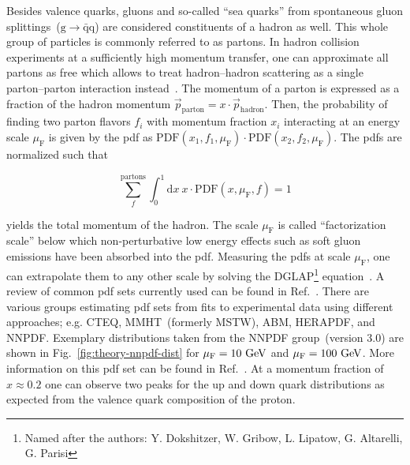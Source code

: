 Besides valence quarks, gluons and so-called ``sea quarks'' from spontaneous gluon splittings~($\mathrm{g}\to\bar{\mathrm{q}}\mathrm{q}$) are considered constituents of a hadron as well. This whole group of particles is commonly referred to as partons. In hadron collision experiments at a sufficiently high momentum transfer, one can approximate all partons as free which allows to treat hadron--hadron scattering as a single parton--parton interaction instead~\cite{Feynman:1969wa}. The momentum of a parton is expressed as a fraction of the hadron momentum $\vec{p}_\mathrm{parton}=x\cdot \vec{p}_\mathrm{hadron}$. Then, the probability of 
finding two parton flavors $f_{i}$ with momentum fraction $x_{i}$ interacting at an energy scale $\mu_\mathrm{F}$ is given by the \gls{pdf} as $\mathrm{PDF}(x_{1},f_{1},\mu_\mathrm{F})\cdot\mathrm{PDF}(x_{2},f_{2},\mu_\mathrm{F})$. The \glspl{pdf} are normalized such that

\begin{equation}
\sum_{f}^\mathrm{partons}\int_{0}^{1}\mathrm{d}x~x\cdot \mathrm{PDF}(x,\mu_\mathrm{F},f)=1
\end{equation}

yields the total momentum of the hadron. The scale $\mu_\mathrm{F}$ is called ``factorization scale'' below which non-perturbative low energy effects such as soft gluon emissions have been absorbed into the \gls{pdf}. Measuring the \glspl{pdf} at scale $\mu_\mathrm{F}$, one can extrapolate them to any other scale by solving the DGLAP\footnote{Named after the authors: Y. Dokshitzer, W. Gribow, L. Lipatow, G. Altarelli, G. Parisi} equation~\cite{Dokshitzer:1977sg,Gribov:1972ri,Altarelli:1977zs}. A review of common \gls{pdf} sets currently used can be found in Ref.~\cite{Accardi2016}. There are various groups estimating \gls{pdf} sets from fits to experimental data using different approaches; e.g. CTEQ, MMHT~(formerly MSTW), ABM, HERAPDF, and NNPDF. Exemplary distributions taken from the NNPDF group~(version 3.0) are shown in Fig.~\ref{fig:theory-nnpdf-dist} for $\mu_\mathrm{F}=10~\mathrm{GeV}$ and $\mu_\mathrm{F}=100~\mathrm{GeV}$. More information on this \gls{pdf} set can be found in Ref.~\cite{Ball:2014uwa}. At a momentum fraction of $x\approx0.2$ one can observe two peaks for the up and down quark distributions as expected from the valence quark composition of the proton.

